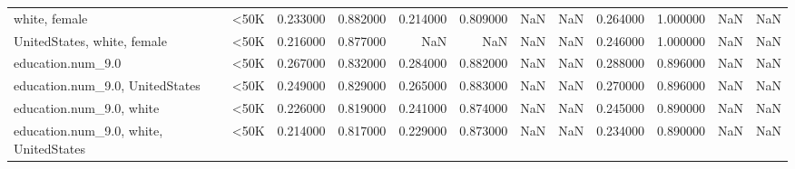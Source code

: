 \begin{tabular}{llrrrrrrrrrr}
white, female & <50K & 0.233000 & 0.882000 & 0.214000 & 0.809000 & NaN & NaN & 0.264000 & 1.000000 & NaN & NaN \\
UnitedStates, white, female & <50K & 0.216000 & 0.877000 & NaN & NaN & NaN & NaN & 0.246000 & 1.000000 & NaN & NaN \\
education.num_9.0 & <50K & 0.267000 & 0.832000 & 0.284000 & 0.882000 & NaN & NaN & 0.288000 & 0.896000 & NaN & NaN \\
education.num_9.0, UnitedStates & <50K & 0.249000 & 0.829000 & 0.265000 & 0.883000 & NaN & NaN & 0.270000 & 0.896000 & NaN & NaN \\
education.num_9.0, white & <50K & 0.226000 & 0.819000 & 0.241000 & 0.874000 & NaN & NaN & 0.245000 & 0.890000 & NaN & NaN \\
education.num_9.0, white, UnitedStates & <50K & 0.214000 & 0.817000 & 0.229000 & 0.873000 & NaN & NaN & 0.234000 & 0.890000 & NaN & NaN \\
\bottomrule
\end{tabular}
